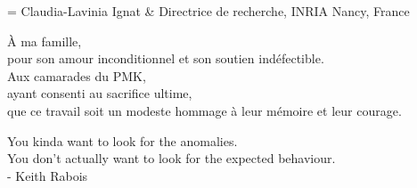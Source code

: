 \documentclass[11pt, nofrench]{thesul}
\theoremstyle{definition}
\begin{document}
\Invites=   {Claudia-Lavinia Ignat & Directrice de recherche, INRIA Nancy, France }



\MakeThesisTitlePage





\begin{ThesisAcknowledgments}

\end{ThesisAcknowledgments}








\begin{ThesisDedication}
    À ma famille, \\
pour son amour inconditionnel et son soutien indéfectible. \\

Aux camarades du PMK, \\
ayant consenti au sacrifice ultime, \\
que ce travail soit un modeste hommage à leur mémoire et leur courage.
\end{ThesisDedication}

\begin{ThesisDedication}
    You kinda want to look for the anomalies. \\
    You don't actually want to look for the expected behaviour. \\
    

    - Keith Rabois
\end{ThesisDedication}
\end{document}
